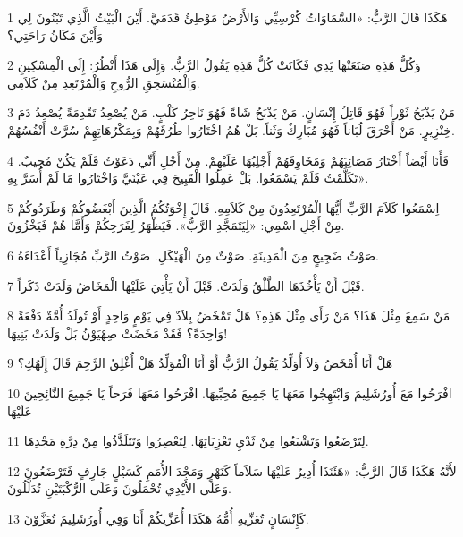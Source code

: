 \par 1 هَكَذَا قَالَ الرَّبُّ: «السَّمَاوَاتُ كُرْسِيِّي وَالأَرْضُ مَوْطِئُ قَدَمَيَّ. أَيْنَ الْبَيْتُ الَّذِي تَبْنُونَ لِي وَأَيْنَ مَكَانُ رَاحَتِي؟
\par 2 وَكُلُّ هَذِهِ صَنَعَتْهَا يَدِي فَكَانَتْ كُلُّ هَذِهِ يَقُولُ الرَّبُّ. وَإِلَى هَذَا أَنْظُرُ: إِلَى الْمِسْكِينِ وَالْمُنْسَحِقِ الرُّوحِ وَالْمُرْتَعِدِ مِنْ كَلاَمِي.
\par 3 مَنْ يَذْبَحُ ثَوْراً فَهُوَ قَاتِلُ إِنْسَانٍ. مَنْ يَذْبَحُ شَاةً فَهُوَ نَاحِرُ كَلْبٍ. مَنْ يُصْعِدُ تَقْدِمَةً يُصْعِدُ دَمَ خِنْزِيرٍ. مَنْ أَحْرَقَ لُبَاناً فَهُوَ مُبَارِكٌ وَثَناً. بَلْ هُمُ اخْتَارُوا طُرُقَهُمْ وَبِمَكْرُهَاتِهِمْ سُرَّتْ أَنْفُسُهُمْ.
\par 4 فَأَنَا أَيْضاً أَخْتَارُ مَصَائِبَهُمْ وَمَخَاوِفَهُمْ أَجْلِبُهَا عَلَيْهِمْ. مِنْ أَجْلِ أَنِّي دَعَوْتُ فَلَمْ يَكُنْ مُجِيبٌ. تَكَلَّمْتُ فَلَمْ يَسْمَعُوا. بَلْ عَمِلُوا الْقَبِيحَ فِي عَيْنَيَّ وَاخْتَارُوا مَا لَمْ أُسَرَّ بِهِ».
\par 5 اِسْمَعُوا كَلاَمَ الرَّبِّ أَيُّهَا الْمُرْتَعِدُونَ مِنْ كَلاَمِهِ. قَالَ إِخْوَتُكُمُ الَّذِينَ أَبْغَضُوكُمْ وَطَرَدُوكُمْ مِنْ أَجْلِ اسْمِي: «لِيَتَمَجَّدِ الرَّبُّ». فَيَظْهَرُ لِفَرَحِكُمْ وَأَمَّا هُمْ فَيَخْزُونَ.
\par 6 صَوْتُ ضَجِيجٍ مِنَ الْمَدِينَةِ. صَوْتٌ مِنَ الْهَيْكَلِ. صَوْتُ الرَّبِّ مُجَازِياً أَعْدَاءَهُ.
\par 7 قَبْلَ أَنْ يَأْخُذَهَا الطَّلْقُ وَلَدَتْ. قَبْلَ أَنْ يَأْتِيَ عَلَيْهَا الْمَخَاضُ وَلَدَتْ ذَكَراً.
\par 8 مَنْ سَمِعَ مِثْلَ هَذَا؟ مَنْ رَأَى مِثْلَ هَذِهِ؟ هَلْ تَمْخَضُ بِلاَدٌ فِي يَوْمٍ وَاحِدٍ أَوْ تُولَدُ أُمَّةٌ دَفْعَةً وَاحِدَةً؟ فَقَدْ مَخَضَتْ صِهْيَوْنُ بَلْ وَلَدَتْ بَنِيهَا!
\par 9 هَلْ أَنَا أُمْخَضُ وَلاَ أُوَلِّدُ يَقُولُ الرَّبُّ أَوْ أَنَا الْمُوَلِّدُ هَلْ أُغْلِقُ الرَّحِمَ قَالَ إِلَهُكِ؟
\par 10 افْرَحُوا مَعَ أُورُشَلِيمَ وَابْتَهِجُوا مَعَهَا يَا جَمِيعَ مُحِبِّيهَا. افْرَحُوا مَعَهَا فَرَحاً يَا جَمِيعَ النَّائِحِينَ عَلَيْهَا
\par 11 لِتَرْضَعُوا وَتَشْبَعُوا مِنْ ثَدْيِ تَعْزِيَاتِهَا. لِتَعْصِرُوا وَتَتَلَذَّذُوا مِنْ دِرَّةِ مَجْدِهَا.
\par 12 لأَنَّهُ هَكَذَا قَالَ الرَّبُّ: «هَئَنَذَا أُدِيرُ عَلَيْهَا سَلاَماً كَنَهْرٍ وَمَجْدَ الأُمَمِ كَسَيْلٍ جَارِفٍ فَتَرْضَعُونَ وَعَلَى الأَيْدِي تُحْمَلُونَ وَعَلَى الرُّكْبَتَيْنِ تُدَلَّلُونَ.
\par 13 كَإِنْسَانٍ تُعَزِّيهِ أُمُّهُ هَكَذَا أُعَزِّيكُمْ أَنَا وَفِي أُورُشَلِيمَ تُعَزَّوْنَ.
